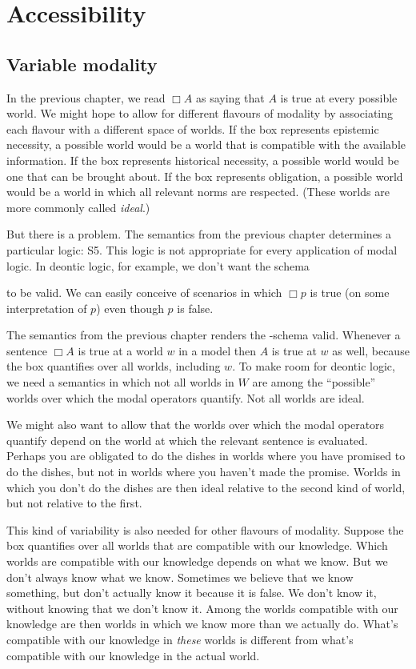 \chapter{Accessibility}\label{ch:accessibility}

\section{Variable modality}

In the previous chapter, we read $\Box A$ as saying that $A$ is true at every
possible world. We might hope to allow for different flavours of modality by
associating each flavour with a different space of worlds. If the box
represents epistemic necessity, a possible world would be a world that is
compatible with the available information. If the box represents historical
necessity, a possible world would be one that can be brought about. If the box
represents obligation, a possible world would be a world in which all relevant
norms are respected. (These worlds are more commonly called \emph{ideal}.)

But there is a problem. The semantics from the previous chapter determines a
particular logic: S5. This logic is not appropriate for every application of
modal logic. In deontic logic, for example, we don't want the schema
%
\begin{principles}
\end{principles}
%
to be valid. We can easily conceive of scenarios in which $\Box p$ is true (on
some interpretation of $p$) even though $p$ is false.

The semantics from the previous chapter renders the -schema valid.
Whenever a sentence $\Box A$ is true at a world $w$ in a model then $A$ is true
at $w$ as well, because the box quantifies over all worlds, including $w$. To
make room for deontic logic, we need a semantics in which not all worlds in $W$
are among the ``possible'' worlds over which the modal operators quantify. Not
all worlds are ideal.

We might also want to allow that the worlds over which the modal operators
quantify depend on the world at which the relevant sentence is evaluated.
Perhaps you are obligated to do the dishes in worlds where you have promised to
do the dishes, but not in worlds where you haven't made the promise. Worlds in
which you don't do the dishes are then ideal relative to the second kind of
world, but not relative to the first.

This kind of variability is also needed for other flavours of modality. Suppose
the box quantifies over all worlds that are compatible with our knowledge. Which
worlds are compatible with our knowledge depends on what we know. But we don't
always know what we know. Sometimes we believe that we know something, but don't
actually know it because it is false. We don't know it, without knowing that we
don't know it. \label{par:notB}Among the worlds compatible with our knowledge
are then worlds in which we know more than we actually do. What's
compatible with our knowledge in \emph{these} worlds is different from what's
compatible with our knowledge in the actual world.


